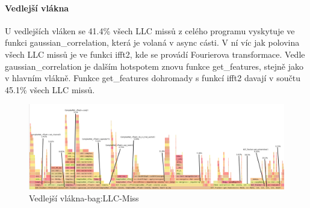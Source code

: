 \documentclass{article}
\begin{document}
\paragraph{Vedlejší vlákna}
U vedlejších vláken se 41.4\% všech LLC missů z celého programu vyskytuje ve funkci gaussian\_correlation, která je volaná v async cásti. V ní víc jak polovina všech LLC missů je ve funkci ifft2, kde se provádí Fourierova transformace. Vedle gaussian\_correlation je dalším hotspotem znovu funkce get\_features, stejně jako v hlavním vlákně. Funkce get\_features dohromady s funkcí ifft2 davají v součtu 45.1\% všech LLC missů.
\begin{figure}[h!]
	\centering
	\includegraphics[width=\linewidth]{Perf/Bag/LLC-Miss-bag-closeup-threads-gimp.png}
	\caption{Vedlejší vlákna-bag:LLC-Miss}
	\label{LLC-Miss-threads}
\end{figure}
\newpage
\end{document}
